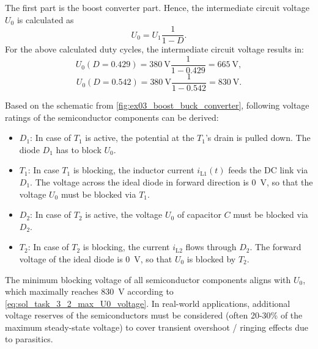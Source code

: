 
\begin{solutionblock}
	The first part is the boost converter part. Hence, the intermediate circuit voltage $U_\mathrm{0}$ is calculated as
	\begin{equation}
		U_\mathrm{0}=U_\mathrm{1} \frac{1}{1-D}.
		\label{eq:DCLinkEx03}
	\end{equation}
	For the above calculated duty cycles, the intermediate circuit voltage results in:
	\begin{equation}
		U_\mathrm{0}(D=0.429)=\SI{380}{\volt} \frac{1}{1-0.429} = \SI{665}{\volt},
	\end{equation}
	\begin{equation}
		U_\mathrm{0}(D=0.542)=\SI{380}{\volt} \frac{1}{1-0.542} = \SI{830}{\volt}.
		\label{eq:sol_task_3_2_max_U0_voltage}
	\end{equation}
\end{solutionblock}


\begin{solutionblock}
	Based on the schematic from \autoref{fig:ex03_boost_buck_converter}, following voltage ratings of the semiconductor components can be derived:
	\begin{itemize}
		\item $D_1$: In case of $T_1$ is active, the potential at the $T_1$'s drain is pulled down. The diode $D_1$ has to block $U_0$.
		\item $T_1$: In case $T_1$ is blocking, the inductor current   $i_\mathrm{L1}(t)$ feeds the DC link via $D_1$. The voltage across the ideal diode in forward direction is \SI{0}{\volt}, so that the voltage $U_0$ must be blocked via $T_1$.
		\item $D_2$: In case of $T_2$ is active, the voltage $U_0$ of capacitor $C$ must be blocked via $D_2$.
		\item $T_2$: In case of $T_2$ is blocking, the current $i_\mathrm{L2}$ flows through $D_2$.
		      The forward voltage of the ideal diode is \SI{0}{\volt}, so that $U_0$ is blocked by $T_2$.
	\end{itemize}
	The minimum blocking voltage of all semiconductor components aligns with $U_\mathrm{0}$, which maximally reaches \SI{830}{\volt} according to \eqref{eq:sol_task_3_2_max_U0_voltage}. In real-world applications, additional voltage reserves of the semiconductors must be considered (often 20-30\% of the maximum steady-state voltage) to cover transient overshoot / ringing effects due to parasitics.
\end{solutionblock}

